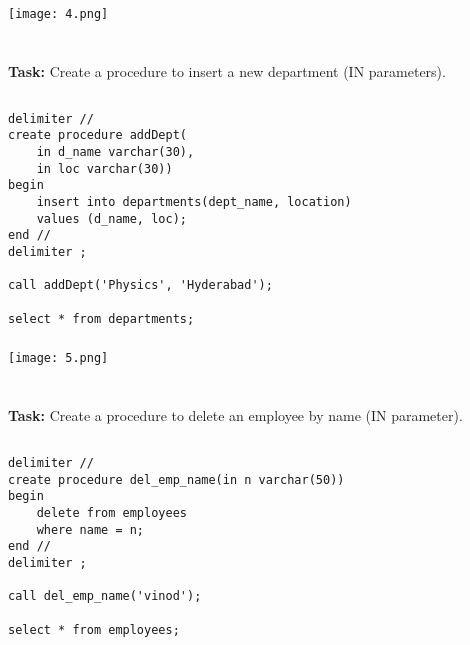 \documentclass[12pt,a4paper]{article}
\begin{document}
\subsubsection{}
\begin{center}
    \texttt{[image: 4.png]}
\end{center}


\section{}
\textbf{Task:} Create a procedure to insert a new department (IN parameters).

\subsection{}
\begin{lstlisting}
delimiter //
create procedure addDept(
    in d_name varchar(30),
    in loc varchar(30))
begin
    insert into departments(dept_name, location)
    values (d_name, loc);
end //
delimiter ;

call addDept('Physics', 'Hyderabad');

select * from departments;
\end{lstlisting}

\subsubsection{}
\begin{center}
    \texttt{[image: 5.png]}
\end{center}


\section{}
\textbf{Task:} Create a procedure to delete an employee by name (IN parameter).

\subsection{}
\begin{lstlisting}
delimiter //
create procedure del_emp_name(in n varchar(50))
begin
    delete from employees
    where name = n;
end //
delimiter ;

call del_emp_name('vinod');

select * from employees;
\end{lstlisting}
\end{document}
